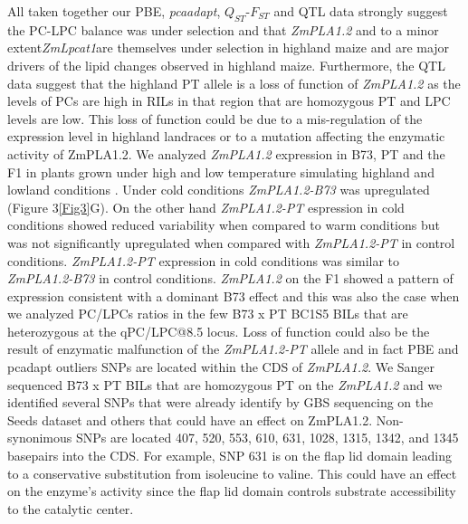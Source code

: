 \documentclass[9pt,twocolumn,twoside,lineno]{gsajnl}
\begin{document}
All taken together our PBE, \textit{pcaadapt}, $Q_{ST}$-$F_{ST}$ and QTL data strongly suggest the PC-LPC balance was under selection and that \textit{ZmPLA1.2} and to a minor extent\textit{ZmLpcat1}are themselves under selection in highland maize and are major drivers of the lipid changes observed in highland maize. 
Furthermore, the QTL data suggest that the highland PT allele is a loss of function of \textit{ZmPLA1.2} as the levels of PCs are high in RILs in that region that are homozygous PT and LPC levels are low. 
This loss of function could be due to a mis-regulation of the expression level in highland landraces or to a mutation affecting the enzymatic activity of ZmPLA1.2. 
We analyzed \textit{ZmPLA1.2} expression in B73, PT and the F1 in plants grown under high and low temperature simulating highland and lowland conditions \cite{Crow2020-gene}. 
Under cold conditions \textit{ZmPLA1.2-B73} was upregulated (Figure 3\ref{Fig3}G). 
On the other hand \textit{ZmPLA1.2-PT} espression in cold conditions showed reduced variability when compared to warm conditions but was not significantly upregulated when compared with \textit{ZmPLA1.2-PT} in control conditions.
\textit{ZmPLA1.2-PT} expression in cold conditions was similar to \textit{ZmPLA1.2-B73} in control conditions.
\textit{ZmPLA1.2} on the F1 showed a pattern of expression consistent with a dominant B73 effect and this was also the case when we analyzed PC/LPCs ratios in the few B73 x PT BC1S5 BILs that are heterozygous at the qPC/LPC@8.5 locus. 
Loss of function could also be the result of enzymatic malfunction of the \textit{ZmPLA1.2-PT} allele and in fact PBE and pcadapt outliers SNPs are located within the CDS of \textit{ZmPLA1.2}. 
We Sanger sequenced B73 x PT BILs that are homozygous PT on the \textit{ZmPLA1.2} and we identified several SNPs that were already identify by GBS sequencing on the Seeds dataset and others that could have an effect on ZmPLA1.2. Non-synonimous SNPs are located 407, 520, 553, 610, 631, 1028, 1315, 1342, and 1345 basepairs into the CDS.
For example, SNP 631 is on the flap lid domain leading to a conservative substitution from isoleucine to valine. This could have an effect on the enzyme's activity since the flap lid domain controls substrate accessibility to the catalytic center. 
\end{document}
